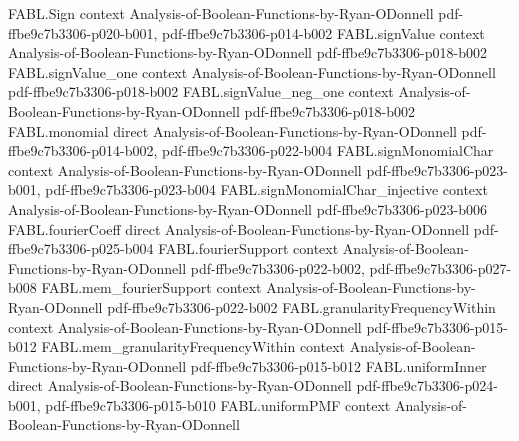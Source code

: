 \begin{theorem}
\label{FABL.noiseStability_eq_uniformInner_noiseOperator}
\leanok
{}
\proofstep
  {FABL.Sign}
  {context}
  {Analysis-of-Boolean-Functions-by-Ryan-ODonnell}
  {pdf-ffbe9c7b3306-p020-b001,
    pdf-ffbe9c7b3306-p014-b002}
\proofstep
  {FABL.signValue}
  {context}
  {Analysis-of-Boolean-Functions-by-Ryan-ODonnell}
  {pdf-ffbe9c7b3306-p018-b002}
\proofstep
  {FABL.signValue_one}
  {context}
  {Analysis-of-Boolean-Functions-by-Ryan-ODonnell}
  {pdf-ffbe9c7b3306-p018-b002}
\proofstep
  {FABL.signValue_neg_one}
  {context}
  {Analysis-of-Boolean-Functions-by-Ryan-ODonnell}
  {pdf-ffbe9c7b3306-p018-b002}
\proofstep
  {FABL.monomial}
  {direct}
  {Analysis-of-Boolean-Functions-by-Ryan-ODonnell}
  {pdf-ffbe9c7b3306-p014-b002,
    pdf-ffbe9c7b3306-p022-b004}
\proofstep
  {FABL.signMonomialChar}
  {context}
  {Analysis-of-Boolean-Functions-by-Ryan-ODonnell}
  {pdf-ffbe9c7b3306-p023-b001,
    pdf-ffbe9c7b3306-p023-b004}
\proofstep
  {FABL.signMonomialChar_injective}
  {context}
  {Analysis-of-Boolean-Functions-by-Ryan-ODonnell}
  {pdf-ffbe9c7b3306-p023-b006}
\proofstep
  {FABL.fourierCoeff}
  {direct}
  {Analysis-of-Boolean-Functions-by-Ryan-ODonnell}
  {pdf-ffbe9c7b3306-p025-b004}
\proofstep
  {FABL.fourierSupport}
  {context}
  {Analysis-of-Boolean-Functions-by-Ryan-ODonnell}
  {pdf-ffbe9c7b3306-p022-b002,
    pdf-ffbe9c7b3306-p027-b008}
\proofstep
  {FABL.mem_fourierSupport}
  {context}
  {Analysis-of-Boolean-Functions-by-Ryan-ODonnell}
  {pdf-ffbe9c7b3306-p022-b002}
\proofstep
  {FABL.granularityFrequencyWithin}
  {context}
  {Analysis-of-Boolean-Functions-by-Ryan-ODonnell}
  {pdf-ffbe9c7b3306-p015-b012}
\proofstep
  {FABL.mem_granularityFrequencyWithin}
  {context}
  {Analysis-of-Boolean-Functions-by-Ryan-ODonnell}
  {pdf-ffbe9c7b3306-p015-b012}
\proofstep
  {FABL.uniformInner}
  {direct}
  {Analysis-of-Boolean-Functions-by-Ryan-ODonnell}
  {pdf-ffbe9c7b3306-p024-b001,
    pdf-ffbe9c7b3306-p015-b010}
\proofstep
  {FABL.uniformPMF}
  {context}
  {Analysis-of-Boolean-Functions-by-Ryan-ODonnell}

\end{theorem}
